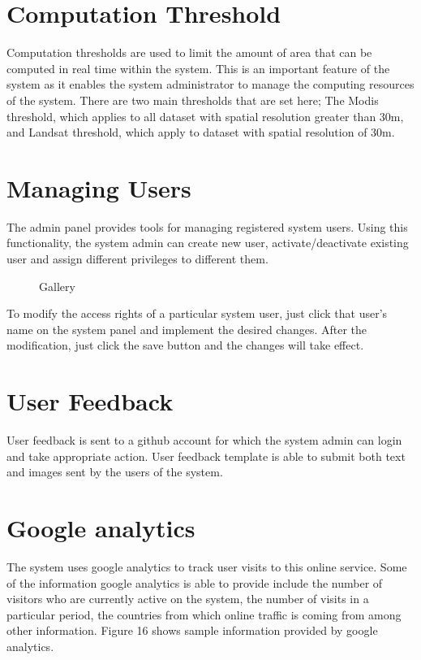 \documentclass[letterpaper,10pt,english]{sphinxmanual}
\let\sphinxpxdimen\pdfpxdimen\else\newdimen\sphinxpxdimen
\begin{document}
\section{Computation Threshold}
\label{\detokenize{Introduction/admin:computation-threshold}}
\sphinxAtStartPar
Computation thresholds are used to limit the amount of area that can be computed in real time within the system. This is an important feature of the system as it enables the system administrator to manage the computing resources of the system.  There are two main thresholds that are set here;  The Modis threshold, which applies to all dataset with spatial resolution greater than 30m, and Landsat threshold, which apply to dataset with spatial resolution of 30m.


\section{Managing Users}
\label{\detokenize{Introduction/admin:managing-users}}
\sphinxAtStartPar
The admin panel provides tools for managing registered system users. Using this functionality, the system admin can create new user, activate/deactivate existing user and assign different privileges to different them.

\begin{figure}[H]
\centering
\capstart

\noindent\sphinxincludegraphics[width=610\sphinxpxdimen,height=234\sphinxpxdimen]{{admin14}.png}
\caption{Gallery}\label{\detokenize{Introduction/admin:id12}}\end{figure}

\sphinxAtStartPar
To modify the access rights of a particular system user, just click that user’s name on the system panel and implement the desired changes. After the modification, just click the save button and the changes will take effect.


\section{User Feedback}
\label{\detokenize{Introduction/admin:user-feedback}}
\sphinxAtStartPar
User feedback is sent to a github account for which the system admin can login and take appropriate action. User feedback template is able to submit both text and images sent by the users of the system.


\section{Google analytics}
\label{\detokenize{Introduction/admin:google-analytics}}
\sphinxAtStartPar
The system uses google analytics to track user visits to this online service. Some of the information google analytics is able to provide include the number of visitors who are currently active on the system, the number of visits in a particular period, the countries from which online traffic is coming from among other information. Figure 16 shows sample information provided by google analytics.
\end{document}
